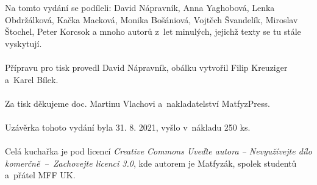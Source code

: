 \setcounter{page}{0}
\tableofcontents
{}
\vspace*{\fill}
\noindent Na tomto vydání se podíleli:
David Nápravník,
Anna Yaghobová,
Lenka Obdržálková,
Kačka Macková,
Monika Bošániová,
Vojtěch Švandelík,
Miroslav Štochel,
Peter Korcsok
a mnoho autorů z~let minulých, jejichž texty se tu stále vyskytují.
\\\\
Přípravu pro tisk provedl David Nápravník,
obálku vytvořil Filip Kreuziger a~Karel Bílek.
\\\\
Za tisk děkujeme doc. Martinu Vlachovi a~nakladatelství MatfyzPress.
\\\\
Uzávěrka tohoto vydání byla 31. 8. 2021, vyšlo v~nákladu 250 ks.
\\\\
Celá kuchařka je pod licencí \textit{Creative Commons Uveďte autora --
Nevyužívejte dílo komerčně~--~Zachovejte licenci 3.0}, kde autorem je Matfyzák,
spolek studentů a~přátel MFF UK.
\newpage
{}